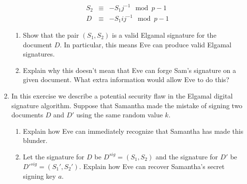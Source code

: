 \documentclass[11pt]{article}
\begin{document}
\begin{enumerate}
{\begin{eqnarray*}
    S_2 &\equiv& -S_1j^{-1}\mod p-1\\
    D &\equiv& -S_1ij^{-1}\mod p-1
  \end{eqnarray*}
  \begin{enumerate}
    \item{
    Show that the pair $(S_1,S_2)$ is a valid Elgamal signature for the document $D$.  In particular, this means Eve can produce valid Elgamal signatures.
    }
    \item{
    Explain why this doesn't mean that Eve can forge Sam's signature on a given document.  What extra information would allow Eve to do this?
    }
  \end{enumerate}
  }
  \item{
  In this exercise we describe a potential security flaw in the Elgamal digital signature algorithm.  Suppose that Samantha made the mistake of signing two documents $D$ and $D'$ using the same random value $k$.
  \begin{enumerate}
    \item{
    Explain how Eve can immediately recognize that Samantha has made this blunder.
    }
    \item{
    Let the signature for $D$ be $D^{sig} = (S_1,S_2)$ and the signature for $D'$ be $D'^{sig} = (S_1',S_2')$.  Explain how Eve can recover Samantha's secret signing key $a$.
    }
  \end{enumerate}
  }
\end{enumerate}
\end{document}
